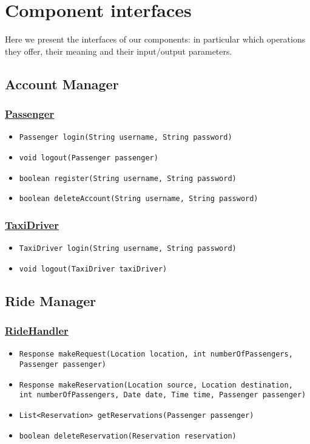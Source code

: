 \section{Component interfaces}
Here we present the interfaces of our components: in particular which operations they offer, their meaning and their input/output parameters.
\subsection{Account Manager}
\subsubsection{\underline{Passenger}}
\begin{itemize}
	\item \texttt{Passenger login(String username, String password)}
	\item \texttt{void logout(Passenger passenger)}
	\item \texttt{boolean register(String username, String password)}
	\item \texttt{boolean deleteAccount(String username, String password)}
\end{itemize}
\subsubsection{\underline{TaxiDriver}}
\begin{itemize}
	\item \texttt{TaxiDriver login(String username, String password)}
	\item \texttt{void logout(TaxiDriver taxiDriver)}
\end{itemize}
\subsection{Ride Manager}
\subsubsection{\underline{RideHandler}}
\begin{itemize}
	\item \texttt{Response makeRequest(Location location, int numberOfPassengers,\\ Passenger passenger)}
	\item \texttt{Response makeReservation(Location source, Location destination, \\ int numberOfPassengers, Date date, Time time, Passenger passenger)}
	\item \texttt{List<Reservation> getReservations(Passenger passenger)}
	\item \texttt{boolean deleteReservation(Reservation reservation)}
\end{itemize}
